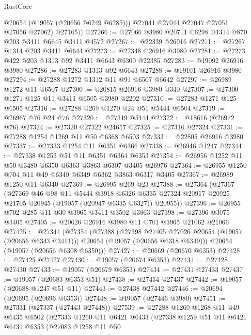 \begin{lexlean}{RustCore}
\begin{coremodule}
            @20654
            (@19057 (@20656 @6249 @6285)))
          @27041
          @27044
          @27047
          @27051
          @27056
          @27062)
        @27165))
@27266 := @27066 @3980 @20711 @6298 @1314 @870 @203 @3411 @6645 @3411 @4572
@27267 := @22339 @26916
@27271 := @27267 @1314 @203 @3411 @6644
@27273 := @22348 @26916 @3980
@27281 := @27273 @422 @203 @1313 @92 @3411 @6643 @6300 @22385
@27283 := @19092 @26916 @3980
@27286 := @27283 @1313 @92 @6643
@27288 := @19101 @26916 @3980
@27294 := @27288 @1272 @1312 @11 @91 @6507 @6642
@27297 := @26989 @1272 @11 @6507
@27300 := @20815 @26916 @3980 @340
@27307 := @27300 @1271 @125 @11 @3411 @6505 @3980 @2202
@27310 := @27283 @1271 @125 @6505
@27316 := @27288 @269 @1270 @24 @51 @5444 @6504
@27319 := @26967 @76 @24 @76
@27320 := @27319 @5444
@27322 := @18616 (@26972 @76)
@27324 := @27320 @27322 @24657
@27325 := @27316 @27324
@27331 := @27288 @1254 @1269 @11 @50 @6368 @6503
@27333 := @22805 @26916 @3980
@27337 := @27333 @1254 @11 @6351 @6366
@27338 := @26946 @1247
@27344 := @27338 @1253 @51 @11 @6351 @6364 @6353
@27354 := @26956 @1252 @11 @50 @3480 @6350 @6363 @3863 @6307 @3405 @26976
@27364 := @26955 @1250 @704 @11 @49 @6340 @6349 @6362 @3863 @6317 @3405
@27367 := @26989 @1250 @11 @6340
@27369 := @26995 @269 @23
@27388 := @27364
    (@27367
      (@27369
        @46
        @98
        @11
        @5444
        @3918
        @6326
        @6335
        @27324
        @20917
        @20925
        @21705
        @20945
        (@19057 (@20947 @6335 @6327))
        @20955))
@27396 := @26955 @702 @285 @11 @30 @3965 @3411 @3502 @3863
@27398 := @27396 @3075 @3405
@27405 := @20626 @26916 @3980 @11 @701 @3965 @21062 @21066
@27425 := @27344
    (@27354
      (@27388
        (@27398 @27405 @27026 @20654 (@19057 (@20656 @6343 @3411)))
        @20654
        (@19057 (@20656 @6318 @6349)))
      @20654
      (@19057 (@20656 @6308 @6350)))
@27427 := @20669 (@20670 @6353)
@27428 := @27425 @27427
@27430 := @19057 (@20674 @6353)
@27431 := @27428 @27430
@27433 := @19057 (@20679 @6353)
@27434 := @27431 @27433
@27437 := @19057 (@20683 @6353 @51)
@27438 := @27434 @27437
@27442 := @19057 (@20688 @1247 @51 @11)
@27443 := @27438 @27442
@27446 := @20694 (@20695 (@20696 @6353))
@27448 := @19057 (@27446 @3980)
@27451 := @27331 (@27337 (@27443 @27448))
@27539 := @27288
    @1260
    @1268
    @11
    @49
    @6435
    @6502
    (@27333
      @1260
      @11
      @6421
      @6433
      (@27338
        @1259
        @51
        @11
        @6421
        @6431
        @6353
        (@27083
          @1258
          @11
          @50

\end{coremodule}
\end{lexlean}

